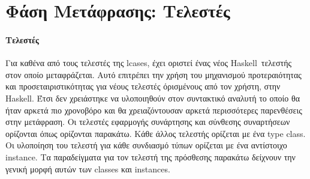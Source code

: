 \documentclass[diploma]{softlab-thesis}
\def\H{Haskell}
\begin{document}
\newpage

\section{Φάση Μετάφρασης: Τελεστές}

\paragraph{Τελεστές}

Για καθένα από τους τελεστές της lcases, έχει οριστεί ένας νέος \H\ τελεστής
στον οποίο μεταφράζεται. Αυτό επιτρέπει την χρήση του μηχανισμού προτεραιότητας
και προσεταιριστικότητας για νέους τελεστές όρισμένους από τον χρήστη, στην \H.
Έτσι δεν χρειάστηκε να υλοποιηθούν στον συντακτικό αναλυτή το οποίο θα ήταν
αρκετά πιο χρονοβόρο και θα χρειαζόντουσαν αρκετά περισσότερες παρενθέσεις στην
μετάφραση. Οι τελεστές εφαρμογής συνάρτησης και σύνθεσης συναρτήσεων ορίζονται
όπως ορίζονται παρακάτω. Κάθε άλλος τελεστής ορίζεται με ένα type class.
Οι υλοποίηση του τελεστή για κάθε συνδιασμό τύπων ορίζεται με ένα αντίστοιχο
instance. Τα παραδείγματα για τον τελεστή της πρόσθεσης παρακάτω δείχνουν
την γενική μορφή αυτών των classes και instances.
\\
\end{document}
